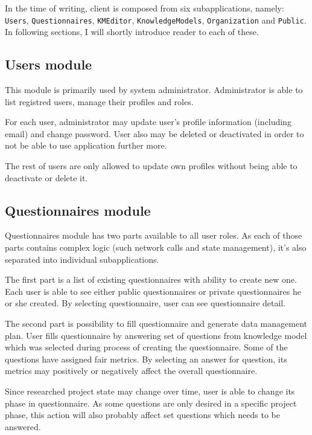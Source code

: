In the time of writing, client is composed from six subapplications, namely: \texttt{Users}, \texttt{Questionnaires}, \texttt{KMEditor}, \texttt{KnowledgeModels}, \texttt{Organization} and \texttt{Public}.
In following sections, I will shortly introduce reader to each of these.

\subsection{Users module}\label{sec:users-module}

This module is primarily used by system administrator.
Administrator is able to list registred users, manage their profiles and roles.

For each user, administrator may update user's profile information (including email) and change password.
User also may be deleted or deactivated in order to not be able to use application further more.

The rest of users are only allowed to update own profiles without being able to deactivate or delete it.

\subsection{Questionnaires module}\label{sec:questionnaires-module}

Questionnaires module has two parts available to all user roles.
As each of those parts contains complex logic (such network calls and state management), it's also separated into individual subapplications.

The first part is a list of existing questionnaires with ability to create new one.
Each user is able to see either public questionnaires or private questionnaires he or she created.
By selecting questionnaire, user can see questionnaire detail.

The second part is possibility to fill questionnaire and generate data management plan.
User fills questionnaire by answering set of questions from knowledge model which was selected during process of creating the questionnaire.
Some of the questions have assigned \gls{fair} metrics.
By selecting an answer for question, its metrics may positively or negatively affect the overall questionnaire.

Since researched project state may change over time, user is able to change its phase in questionnaire.
As some questions are only desired in a specific project phase, this action will also probably affect set questions which needs to be answered.

